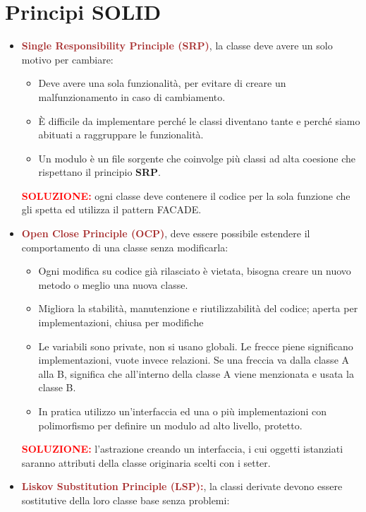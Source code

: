 \section{Principi SOLID}
\begin{itemize}
    \item \textbf{\textcolor{brown}{Single Responsibility Principle (SRP)}}, la classe deve avere un solo motivo per cambiare:
    \begin{itemize}
        \item Deve avere una sola funzionalità, per evitare di creare un malfunzionamento in caso di cambiamento.
        \item È difficile da implementare perché le classi diventano tante e perché siamo abituati a raggruppare le funzionalità.
        \item Un modulo è un file sorgente che coinvolge più classi ad alta coesione che rispettano il principio \textbf{SRP}.
    \end{itemize}
    \textbf{\textcolor{red}{SOLUZIONE:}} ogni classe deve contenere il codice per la sola funzione che gli spetta ed utilizza il pattern FACADE.
    \item \textbf{\textcolor{brown}{Open Close Principle (OCP)}}, deve essere possibile estendere il comportamento di una classe senza modificarla:
    \begin{itemize}
        \item Ogni modifica su codice già rilasciato è vietata, bisogna creare un nuovo metodo o meglio una nuova classe.
        \item Migliora la stabilità, manutenzione e riutilizzabilità del codice; aperta per implementazioni, chiusa per modifiche
        \item Le variabili sono private, non si usano globali. Le frecce piene significano implementazioni, vuote invece relazioni. Se una freccia va dalla classe A alla B, significa che all'interno della classe A viene menzionata e usata la classe B.
        \item In pratica utilizzo un'interfaccia ed una o più implementazioni con polimorfismo per definire un modulo ad alto livello, protetto.
    \end{itemize}
    \textbf{\textcolor{red}{SOLUZIONE:}} l'astrazione creando un interfaccia, i cui oggetti istanziati saranno attributi della classe originaria scelti con i setter.
    \item \textbf{\textcolor{brown}{Liskov Substitution Principle (LSP):}}, la classi derivate devono essere sostitutive della loro classe base senza problemi:

\end{itemize}
